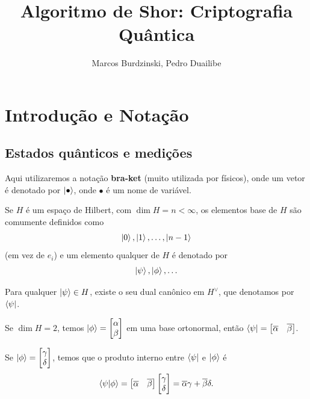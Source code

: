 \documentclass[11pt]{scrartcl}
\numberwithin{example}{section}
\begin{document}
\title{Algoritmo de Shor: Criptografia Quântica}
\author{Marcos Burdzinski, Pedro Duailibe}
\date{}
\maketitle
\newpage
\tableofcontents
\newpage

\section{Introdução e Notação}

\subsection{Estados quânticos e medições}

Aqui utilizaremos a notação \textbf{bra-ket} (muito utilizada por físicos), onde um vetor é denotado por $\ket \bullet$, onde $\bullet$ é um nome de variável. 

\begin{example}
   Se $H$ é um espaço de Hilbert, com $\dim H = n < \infty$, os elementos base de $H$ são comumente definidos como
   \begin{align*}
     \ket 0, \ket 1, \dots , \ket {n-1}
   \end{align*}
   (em vez de $e_i$) e um elemento qualquer de $H$ é denotado por 
   \begin{align*}
       \ket \psi, \ket \phi, \dots
   \end{align*}
   
\end{example}

Para qualquer $\ket \psi \in H$, existe o seu dual canônico em $H ^\vee$, que denotamos por $\bra \psi$.

\begin{example}
   Se $\dim H = 2$, temos $\ket \phi = \begin{bmatrix} \alpha \\ \beta \end{bmatrix}$ em uma base ortonormal, então $\bra \psi = \begin{bmatrix} \overline \alpha & \overline \beta \end{bmatrix}$.

   Se $\ket \phi = \begin{bmatrix} \gamma \\ \delta \end{bmatrix}$, temos que o produto interno entre $\bra \psi$ e $\ket \phi$ é
   \begin{align*}
     \braket{\psi|\phi} = \begin{bmatrix} \overline \alpha & \overline \beta \end{bmatrix} \begin{bmatrix} \gamma \\ \delta \end{bmatrix} = \overline \alpha \gamma + \overline \beta \delta.
   \end{align*}
\end{example}
\end{document}
